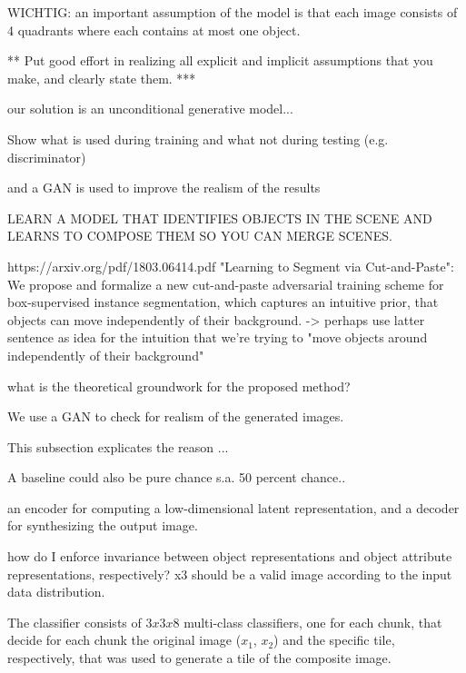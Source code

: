 \documentclass[12pt,a4paper]{article}
\begin{document}
\par WICHTIG: an important assumption of the model is that each image consists of 4 quadrants where each contains at most one object.

\par ***
Put good effort in realizing
all explicit and implicit assumptions that you make, and
clearly state them.
***

\par our solution is an unconditional generative model...

\par Show what is used during training and what not during testing (e.g. discriminator)

\par and a GAN is used to improve the realism of the results

\par LEARN A MODEL THAT IDENTIFIES OBJECTS IN THE SCENE AND LEARNS TO COMPOSE THEM SO YOU CAN MERGE SCENES.

\par https://arxiv.org/pdf/1803.06414.pdf "Learning to Segment via Cut-and-Paste": We propose and formalize a new cut-and-paste adversarial training scheme for box-supervised instance segmentation, which captures an intuitive prior, that objects can move independently of their background.
-> perhaps use latter sentence as idea for the intuition that we're trying to "move objects around independently of their background"

\par what is the theoretical groundwork for the proposed method?

\par We use a GAN to check for realism of the generated images.

\par This subsection explicates the reason ...

\par A baseline could also be pure chance s.a. 50 percent chance..

\par an encoder for computing a low-dimensional latent representation, and a decoder for synthesizing the output image.

how do I enforce invariance between object representations and object attribute representations, respectively?
x3 should be a valid image according to the input data distribution.

The classifier consists of $3x3x8$ multi-class classifiers, one for each chunk, that decide for each chunk the original image ($x_1$, $x_2$) and the specific tile, respectively, that was used to generate a tile of the composite image.
\end{document}
